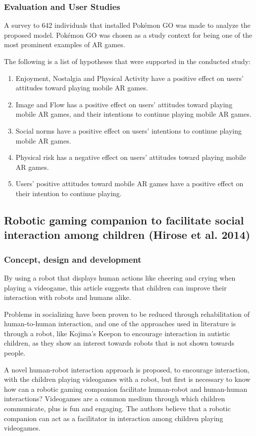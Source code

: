 \documentclass[runningheads]{llncs}
\begin{document}
\subsubsection{Evaluation and User Studies}
\par A survey to 642 individuals that installed Pokémon GO was made to analyze the proposed model. Pokémon GO was chosen as a study context for being one of the most prominent examples of AR games.
\par The following is a list of hypotheses that were supported in the conducted study:
\begin{enumerate}
    \item Enjoyment, Nostalgia and Physical Activity have a positive effect on users' attitudes toward playing mobile AR games.
    \item Image and Flow has a positive effect on users' attitudes toward playing mobile AR games, and their intentions to continue playing mobile AR games.
    \item Social norms have a positive effect on users' intentions to continue playing mobile AR games.
    \item Physical risk has a negative effect on users' attitudes toward playing mobile AR games.
    \item Users' positive attitudes toward mobile AR games have a positive effect on their intention to continue playing.
\end{enumerate}


\subsection{Robotic gaming companion to facilitate social interaction among children (Hirose et al. 2014)}

\subsubsection{Concept, design and development}
\par By using a robot that displays human actions like cheering and crying when playing a videogame, this article suggests that children can improve their interaction with robots and humans alike.

\par Problems in socializing have been proven to be reduced through rehabilitation of human-to-human interaction, and one of the approaches used in literature is through a robot, like Kojima's Keepon to encourage interaction in autistic children, as they show an interest towards robots that is not shown towards people.
\par A novel human-robot interaction approach is proposed, to encourage interaction, with the children playing videogames with a robot, but first is necessary to know how can a robotic gaming companion facilitate human-robot and human-human interactions? Videogames are a common medium through which children communicate, plus is fun and engaging. The authors believe that a robotic companion can act as a facilitator in interaction among children playing videogames.
\end{document}
